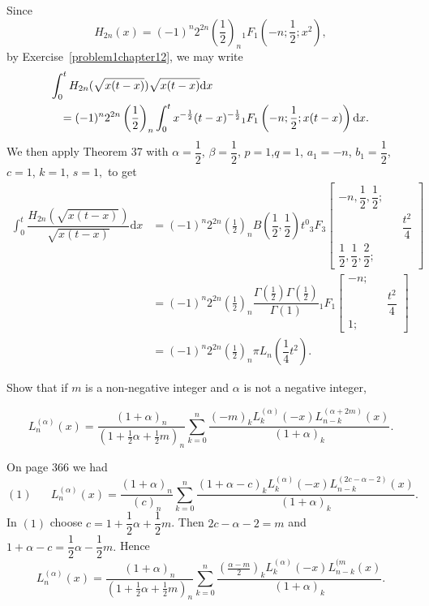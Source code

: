 \begin{solution}
Since 
$$H_{2n}(x) = (-1)^n 2^{2n} \left( \dfrac{1}{2} \right)_n {}_1F_1 \left( -n; \dfrac{1}{2}; x^2 \right),$$
by Exercise~\ref{problem1chapter12}, we may write
\begin{eqnarray*}
\lefteqn{\displaystyle\int_0^t H_{2n}(\sqrt{x(t-x)}){\sqrt{x(t-x)}} \mathrm{d}x} \\
& & = (-1)^n 2^{2n} \left(\frac{1}{2} \right)_n \displaystyle\int_0^t x^{-\frac{1}{2}} (t-x)^{-\frac{1}{2}} {}_1F_1 \left( -n; \dfrac{1}{2}; x(t-x) \right)\mathrm{d}x.
\end{eqnarray*}
We then apply Theorem 37 with $\alpha = \dfrac{1}{2}$, $\beta= \dfrac{1}{2}$, $p=1$,$q=1$, $a_1=-n$, $b_1 = \dfrac{1}{2}$, $c=1$, $k=1$, $s=1,$ to get
$$\begin{array}{ll}
\displaystyle\int_0^t \dfrac{H_{2n}(\sqrt{x(t-x)})}{\sqrt{x(t-x)}} \mathrm{d}x &= (-1)^n 2^{2n} (\frac{1}{2})_n B \left( \dfrac{1}{2}, \dfrac{1}{2} \right) t^0 {}_3F_3 \left[ \begin{array}{rlr}
-n, \dfrac{1}{2}, \dfrac{1}{2}; & & \\
& & \dfrac{t^2}{4} \\
\dfrac{1}{2}, \dfrac{1}{2}, \dfrac{2}{2}; & & 
\end{array} \right] \\
&= (-1)^n 2^{2n} (\frac{1}{2})_n \dfrac{\Gamma(\frac{1}{2}) \Gamma(\frac{1}{2})}{\Gamma(1)} {}_1F_1 \left[ \begin{array}{rlr}
-n; & & \\\
& & \dfrac{t^2}{4} \\
1; & &
\end{array} \right] \\
&= (-1)^n 2^{2n} (\frac{1}{2})_n \pi L_n \left( \dfrac{1}{4} t^2 \right).
\end{array}$$
\end{solution}
\begin{problem}\label{problem6chapter12}
Show that if $m$ is a non-negative integer and $\alpha$ is not a negative integer,

$$L_n^{(\alpha)}(x) = \dfrac{(1+\alpha)_n}{(1 + \frac{1}{2}\alpha+ \frac{1}{2}m)_n} \displaystyle\sum_{k=0}^n \dfrac{(-m)_k L_k^{(\alpha)}(-x) L_{n-k}^{(\alpha+2m)}(x)}{(1+\alpha)_k}.$$
\end{problem}
\begin{solution}
On page 366 we had
$$(1) \hspace{20pt} L_n^{(\alpha)}(x) = \dfrac{(1+\alpha)_n}{(c)_n} \displaystyle\sum_{k=0}^n \dfrac{(1+\alpha-c)_k L_k^{(\alpha)}(-x) L_{n-k}^{(2c-\alpha-2)}(x)}{(1+\alpha)_k}.$$
In $(1)$ choose $c= 1 + \dfrac{1}{2} \alpha + \dfrac{1}{2}m$. Then $2c-\alpha-2=m$ and $1 + \alpha-c = \dfrac{1}{2}\alpha - \dfrac{1}{2}m.$ Hence
$$L_n^{(\alpha)}(x) = \dfrac{(1+\alpha)_n}{(1 + \frac{1}{2}\alpha + \frac{1}{2}m)_n} \displaystyle\sum_{k=0}^n \dfrac{(\frac{\alpha-m}{2})_k L_k^{(\alpha)}(-x) L_{n-k}^{(m}(x)}{(1+\alpha)_k}.$$
\end{solution}
